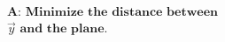 \documentclass[preview]{standalone}
\begin{document}
\begin{align*}
\textbf{A:} \,\, \textbf{Minimize} \,\, \textbf{the distance between} \\ \vec{y} \,\, \textbf{and the plane.}
\end{align*}
\end{document}
